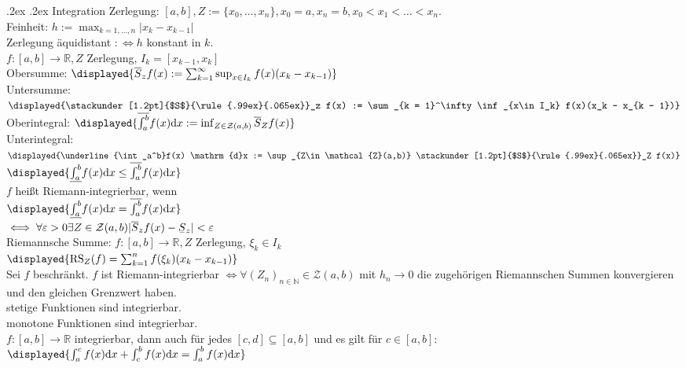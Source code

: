 \documentclass[9pt, landscape,a4paper]{extarticle}
\makeatletter
\let\bar\overline
\renewcommand{\section}{\@startsection{section}{1}{0mm}%
                                {.2ex}%
                                {.2ex}%
                                {\sffamily\small\bfseries}}
\newcommand*\abs[1]{\lvert#1\rvert}
\newcommand\eps{\varepsilon}
\renewcommand\d{\mathrm{d}}
\newcommand\RS{\mathrm{RS}}
\newcommand\ubar[1]{\stackunder[1.2pt]{$#1$}{\rule{.99ex}{.065ex}}}
\makeatother
\begin{document}
\begin{multicols*}{4}
  \section{Integration}
  Zerlegung: $[a,b], Z := \{x_0, \dots, x_n\}, x_0 = a, x_n = b, x_0 < x_1 < \dots < x_n$. \\
  Feinheit: $h := \max_{k = 1,\dots, n}\abs{x_k - x_{k - 1}}$ \\
  Zerlegung äquidistant $:\iff h$ konstant in $k$. \\
  $f:[a,b] \to \mathbb{R}, Z$ Zerlegung, $I_k = [x_{k - 1}, x_k]$ \\
  Obersumme: $\displayed{\bar S_z f(x) := \sum_{k = 1}^\infty \sup_{x\in I_k} f(x)(x_k - x_{k - 1})}$ \\
  Untersumme: $\displayed{\ubar S_z f(x) := \sum_{k = 1}^\infty \inf_{x\in I_k} f(x)(x_k - x_{k - 1})}$ \\
  Oberintegral: $\displayed{\overline{\int_a^b}f(x) \d x := \inf_{Z\in\mathcal{Z}(a,b)} \bar S_Z f(x)}$ \\
  Unterintegral: $\displayed{\underline{\int_a^b}f(x) \d x := \sup_{Z\in\mathcal{Z}(a,b)} \ubar S_Z f(x)}$ \\
  $\displayed{\underline{\int_a^b}f(x)\d x \leq \overline{\int_a^b}f(x)\d x}$ \\
  $f$ heißt Riemann-integrierbar, wenn \\
  $\displayed{\underline{\int_a^b}f(x)\d x = \overline{\int_a^b}f(x)\d x}$ \\
  $\iff \forall \eps > 0 \exists Z\in\mathcal{Z}(a,b)\abs{\bar S_z f(x) - \ubar S_z} < \eps$ \\
  Riemannsche Summe: $f:[a, b] \to \mathbb{R}, Z$ Zerlegung, $\xi_k \in I_k$ \\
  $\displayed{\RS_Z(f) = \sum_{k = 1}^n f(\xi_k)(x_k - x_{k - 1})}$ \\
  Sei $f$ beschränkt. $f$ ist Riemann-integrierbar $\iff \forall (Z_n)_{n\in\mathbb{N}} \in \mathcal{Z}(a,b)$ mit
  $h_n \to 0$ die zugehörigen Riemannschen Summen konvergieren und den gleichen Grenzwert haben. \\
  stetige Funktionen sind integrierbar. \\
  monotone Funktionen sind integrierbar. \\
  $f:[a,b] \to \mathbb{R}$ integrierbar, dann auch für jedes $[c,d]\subseteq [a,b]$ und es gilt
  für $c\in[a,b]$: \\
  $\displayed{\int_a^c f(x) \d x + \int_c^b f(x) \d x = \int_a^b f(x)\d x}$ \\

\end{multicols*}
\end{document}
